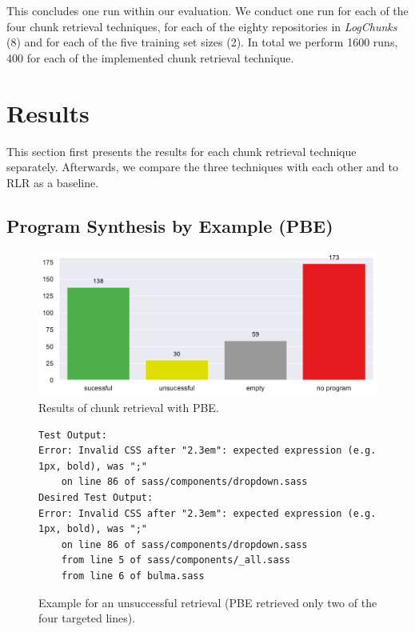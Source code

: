 This concludes one run within our evaluation.
We conduct one run for each of the four chunk retrieval techniques,
for each of the eighty repositories in \emph{LogChunks} (8)
and for each of the five training set sizes (2).
In total we perform 1600 runs, 400 for each of the implemented chunk
retrieval
technique.

\section{Results}
This section first presents the results for each chunk retrieval
technique separately.
Afterwards, we compare the three techniques with each other and to RLR
as a baseline.

\subsection{Program Synthesis by Example (PBE)}
\label{sec:r:pbe}

\begin{figure}[tbp]
		\centering
		\includegraphics[width=\columnwidth,
		clip]{img/big-study/failure-reason-pbe.pdf}
		\caption{Results of chunk retrieval with PBE.}
		\label{fig:failure-reason-PBE}
\end{figure}

\begin{figure}[!t]
  \centering
  \begin{lstlisting}[breaklines=true]
Test Output:
Error: Invalid CSS after "2.3em": expected expression (e.g.
1px, bold), was ";"
	on line 86 of sass/components/dropdown.sass
Desired Test Output:
Error: Invalid CSS after "2.3em": expected expression (e.g.
1px, bold), was ";"
	on line 86 of sass/components/dropdown.sass
	from line 5 of sass/components/_all.sass
	from line 6 of bulma.sass
  \end{lstlisting}
  \caption{Example for an unsuccessful retrieval (PBE retrieved only
  two of the four targeted lines).}
  \label{lst:pbe-unsuccessful}
\end{figure}

